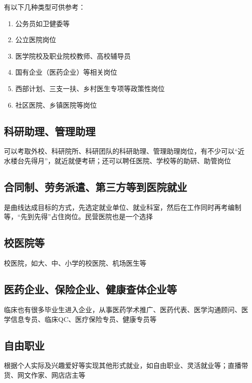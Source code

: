 有以下几种类型可供参考：
\begin{enumerate}
    \item 公务员如卫健委等
    \item 公立医院岗位
    \item 医学院校及职业院校教师、高校辅导员
    \item 国有企业（医药企业）等相关岗位
    \item 西部计划、三支一扶、乡村医生专项等政策性岗位
    \item 社区医院、乡镇医院等岗位
\end{enumerate}

\subsection[科研助理、管理助理]{科研助理、管理助理}
可以考取外校、科研院所、科研团队的科研助理、管理助理岗位，有不少可以“近水楼台先得月”，就近就便考研；还可以聘任医院、学校等的助研、助管岗位

\subsection[合同制、劳务派遣、第三方等到医院就业]{合同制、劳务派遣、第三方等到医院就业}
是曲线达成目标的方式，先选定就业单位、就业科室，然后在工作同时再考编制等，“先到先得”占住岗位。民营医院也是一个选择

\subsection[校医院等]{校医院等}
校医院，如大、中、小学的校医院、机场医生等

\subsection[医药企业、保险企业、健康查体企业等]{医药企业、保险企业、健康查体企业等}
临床也有很多毕业生进入企业，从事医药学术推广、医药代表、医学沟通顾问、医学信息专员、临床QC、医疗保险专员、健康专员等

\subsection[自由职业]{自由职业}
根据个人实际及兴趣爱好等实现其他形式就业，如自由职业、灵活就业等；直播带货、网文作家、网店店主等

